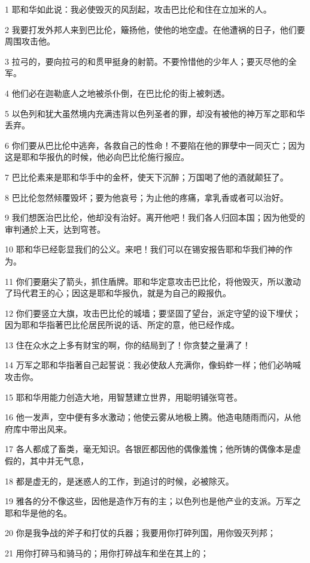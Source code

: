 \par 1 耶和华如此说：我必使毁灭的风刮起，攻击巴比伦和住在立加米的人。
\par 2 我要打发外邦人来到巴比伦，簸扬他，使他的地空虚。在他遭祸的日子，他们要周围攻击他。
\par 3 拉弓的，要向拉弓的和贯甲挺身的射箭。不要怜惜他的少年人；要灭尽他的全军。
\par 4 他们必在迦勒底人之地被杀仆倒，在巴比伦的街上被刺透。
\par 5 以色列和犹大虽然境内充满违背以色列圣者的罪，却没有被他的神万军之耶和华丢弃。
\par 6 你们要从巴比伦中逃奔，各救自己的性命！不要陷在他的罪孽中一同灭亡；因为这是耶和华报仇的时候，他必向巴比伦施行报应。
\par 7 巴比伦素来是耶和华手中的金杯，使天下沉醉；万国喝了他的酒就颠狂了。
\par 8 巴比伦忽然倾覆毁坏；要为他哀号；为止他的疼痛，拿乳香或者可以治好。
\par 9 我们想医治巴比伦，他却没有治好。离开他吧！我们各人归回本国；因为他受的审判通於上天，达到穹苍。
\par 10 耶和华已经彰显我们的公义。来吧！我们可以在锡安报告耶和华我们神的作为。
\par 11 你们要磨尖了箭头，抓住盾牌。耶和华定意攻击巴比伦，将他毁灭，所以激动了玛代君王的心；因这是耶和华报仇，就是为自己的殿报仇。
\par 12 你们要竖立大旗，攻击巴比伦的城墙；要坚固了望台，派定守望的设下埋伏；因为耶和华指著巴比伦居民所说的话、所定的意，他已经作成。
\par 13 住在众水之上多有财宝的啊，你的结局到了！你贪婪之量满了！
\par 14 万军之耶和华指著自己起誓说：我必使敌人充满你，像蚂蚱一样；他们必呐喊攻击你。
\par 15 耶和华用能力创造大地，用智慧建立世界，用聪明铺张穹苍。
\par 16 他一发声，空中便有多水激动；他使云雾从地极上腾。他造电随雨而闪，从他府库中带出风来。
\par 17 各人都成了畜类，毫无知识。各银匠都因他的偶像羞愧；他所铸的偶像本是虚假的，其中并无气息，
\par 18 都是虚无的，是迷惑人的工作，到追讨的时候，必被除灭。
\par 19 雅各的分不像这些，因他是造作万有的主；以色列也是他产业的支派。万军之耶和华是他的名。
\par 20 你是我争战的斧子和打仗的兵器；我要用你打碎列国，用你毁灭列邦；
\par 21 用你打碎马和骑马的；用你打碎战车和坐在其上的；
